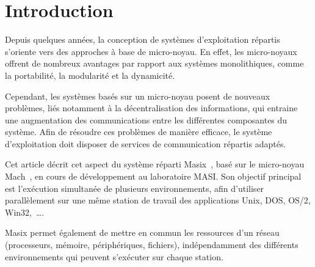 
\newcommand{\myitem} {
	\vspace{-2mm}
	\item 
}


\frenchspacing



\IEEEheader

\sloppy

\section{Introduction}
Depuis quelques ann\'ees, la conception de syst\`emes d'exploitation r\'epartis
s'oriente vers des approches \`a base de micro-noyau. En effet, les
micro-noyaux offrent de nombreux avantages par rapport aux syst\`emes
monolithiques, comme la portabilit\'e, la modularit\'e et la dynamicit\'e.

Cependant, les syst\`emes bas\'es sur un micro-noyau posent de nouveaux probl\`emes, 
li\'es notamment \`a la d\'ecentralisation des informations, qui entraine une 
augmentation des communications entre les diff\'erentes composantes du syst\`eme.
Afin de r\'esoudre ces probl\`emes de mani\`ere efficace, le syst\`eme 
d'exploitation doit disposer de services de 
communication r\'epartis adapt\'es.

Cet article d\'ecrit cet aspect du syst\`eme r\'eparti Masix~\cite{masix:osf}, 
bas\'e sur le micro-noyau Mach~\cite{mach:foundation}, en cours de d\'eveloppement
au laboratoire MASI. 
Son objectif principal est l'ex\'ecution simultan\'ee de plusieurs 
environnements, afin d'utiliser 
parall\`element sur une m\^eme station de travail des applications Unix, DOS, 
OS/2, Win32,~\dots. 

Masix permet \'egalement de mettre en commun les ressources d'un r\'eseau 
(processeurs, m\'emoire, p\'eriph\'eriques, fichiers), 
ind\'ependamment des diff\'erents environnements qui peuvent s'ex\'ecuter
sur chaque station.

